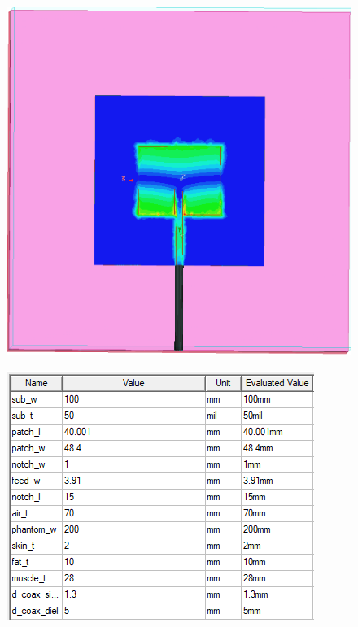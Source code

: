 \documentclass[10pt, a4paper]{article}%
\begin{document}
\begin{figure}[ht!]
\centering
	\includegraphics[height = 0.25\textheight]{EFIELD_coax_phase.png}
\end{figure}
\clearpage
\begin{figure}[ht!]
	\centering
		\includegraphics[]{variables.png}
	\end{figure}
\end{document}
